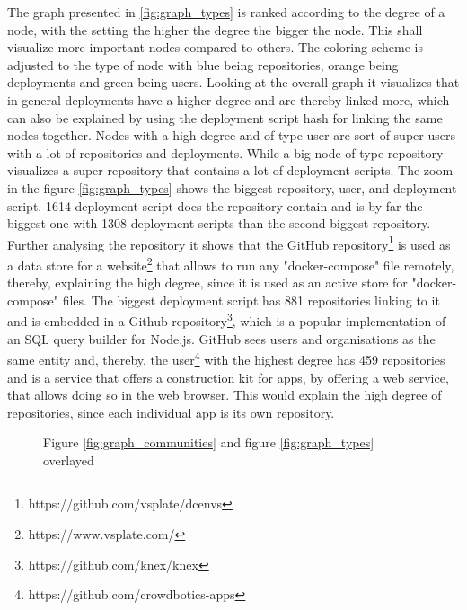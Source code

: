 The graph presented in \ref{fig:graph_types} is ranked according to the degree of a node, with the setting the higher the degree the bigger the node. This shall visualize more important nodes compared to others. The coloring scheme is adjusted to the type of node with blue being repositories, orange being deployments and green being users. Looking at the overall graph it visualizes that in general deployments have a higher degree and are thereby linked more, which can also be explained by using the deployment script hash for linking the same nodes together. Nodes with a high degree and of type user are sort of super users with a lot of repositories and deployments. While a big node of type repository visualizes a super repository that contains a lot of deployment scripts.
The zoom in the figure \ref{fig:graph_types} shows the biggest repository, user, and deployment script.
1614 deployment script does the repository contain and is by far the biggest one with 1308 deployment scripts than the second biggest repository. Further analysing the repository it shows that the GitHub repository\footnote{https://github.com/vsplate/dcenvs} is used as a data store for a website\footnote{https://www.vsplate.com/} that allows to run any "docker-compose" file remotely, thereby, explaining the high degree, since it is used as an active store for "docker-compose" files.
The biggest deployment script has 881 repositories linking to it and is embedded in a Github repository\footnote{https://github.com/knex/knex}, which is a popular implementation of an SQL query builder for Node.js.
GitHub sees users and organisations as the same entity and, thereby, the user\footnote{https://github.com/crowdbotics-apps} with the highest degree has 459 repositories and is a service that offers a construction kit for apps, by offering a web service, that allows doing so in the web browser. This would explain the high degree of repositories, since each individual app is its own repository.

\begin{figure}[H]\centering
{}
    \caption{Figure \ref{fig:graph_communities} and figure \ref{fig:graph_types} overlayed}
    \label{fig:graph_merged}
\end{figure}

